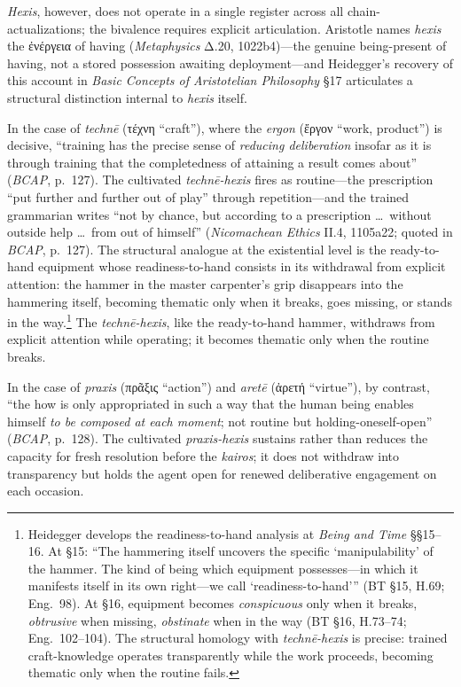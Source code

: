 \documentclass{article}
\newcommand{\gk}[1]{{\greekfont #1}}
\begin{document}
\textit{Hexis}, however, does not operate in a single register across all chain-actualizations; the bivalence requires explicit articulation. Aristotle names \textit{hexis} the \gk{ἐνέργεια} of having (\textit{Metaphysics} Δ.20, 1022b4)---the genuine being-present of having, not a stored possession awaiting deployment---and Heidegger's recovery of this account in \textit{Basic Concepts of Aristotelian Philosophy} \S17 articulates a structural distinction internal to \textit{hexis} itself.

In the case of \textit{technē} (\gk{τέχνη} ``craft''), where the \textit{ergon} (\gk{ἔργον} ``work, product'') is decisive, ``training has the precise sense of \textit{reducing deliberation} insofar as it is through training that the completedness of attaining a result comes about'' (\textit{BCAP}, p.~127). The cultivated \textit{technē-hexis} fires as routine---the prescription ``put further and further out of play'' through repetition---and the trained grammarian writes ``not by chance, but according to a prescription \ldots\ without outside help \ldots\ from out of himself'' (\textit{Nicomachean Ethics} II.4, 1105a22; quoted in \textit{BCAP}, p.~127). The structural analogue at the existential level is the ready-to-hand equipment whose readiness-to-hand consists in its withdrawal from explicit attention: the hammer in the master carpenter's grip disappears into the hammering itself, becoming thematic only when it breaks, goes missing, or stands in the way.\footnote{Heidegger develops the readiness-to-hand analysis at \textit{Being and Time} \S\S15--16. At \S15: ``The hammering itself uncovers the specific `manipulability' of the hammer. The kind of being which equipment possesses---in which it manifests itself in its own right---we call `readiness-to-hand''' (BT \S15, H.69; Eng.~98). At \S16, equipment becomes \textit{conspicuous} only when it breaks, \textit{obtrusive} when missing, \textit{obstinate} when in the way (BT \S16, H.73--74; Eng.~102--104). The structural homology with \textit{technē-hexis} is precise: trained craft-knowledge operates transparently while the work proceeds, becoming thematic only when the routine fails.} The \textit{technē-hexis}, like the ready-to-hand hammer, withdraws from explicit attention while operating; it becomes thematic only when the routine breaks.

In the case of \textit{praxis} (\gk{πρᾶξις} ``action'') and \textit{aretē} (\gk{ἀρετή} ``virtue''), by contrast, ``the how is only appropriated in such a way that the human being enables himself \textit{to be composed at each moment}; not routine but holding-oneself-open'' (\textit{BCAP}, p.~128). The cultivated \textit{praxis-hexis} sustains rather than reduces the capacity for fresh resolution before the \textit{kairos}; it does not withdraw into transparency but holds the agent open for renewed deliberative engagement on each occasion.
\end{document}
